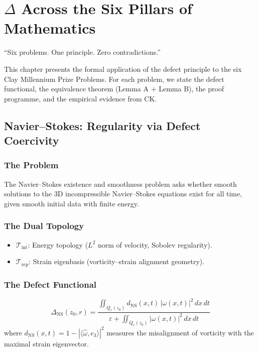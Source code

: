 \documentclass[12pt, openany]{book}
\theoremstyle{remark}
\newcommand{\Tint}{\mathcal{T}_{\mathrm{int}}}
\newcommand{\Trep}{\mathcal{T}_{\mathrm{rep}}}
\begin{document}
\chapter{$\Delta$ Across the Six Pillars of Mathematics}
\label{ch:six-pillars}

\epigraph{``Six problems. One principle. Zero contradictions.''}{}

This chapter presents the formal application of the defect principle to the six
Clay Millennium Prize Problems. For each problem, we state the defect functional,
the equivalence theorem (Lemma A $+$ Lemma B), the proof programme, and the
empirical evidence from CK.

\section{Navier--Stokes: Regularity via Defect Coercivity}
\label{sec:ns}

\subsection{The Problem}
The Navier--Stokes existence and smoothness problem asks whether smooth solutions
to the 3D incompressible Navier--Stokes equations exist for all time, given smooth
initial data with finite energy.

\subsection{The Dual Topology}
\begin{itemize}
  \item $\Tint$: Energy topology ($L^2$ norm of velocity, Sobolev regularity).
  \item $\Trep$: Strain eigenbasis (vorticity--strain alignment geometry).
\end{itemize}

\subsection{The Defect Functional}
\[
  \boxed{\Delta_{\mathrm{NS}}(z_0, r) = \frac{\displaystyle\iint_{Q_r(z_0)} d_{\mathrm{NS}}(x,t)\, |\omega(x,t)|^2\, dx\, dt}{\displaystyle\varepsilon + \iint_{Q_r(z_0)} |\omega(x,t)|^2\, dx\, dt}}
\]
where $d_{\mathrm{NS}}(x,t) = 1 - |\langle \hat{\omega}, e_3 \rangle|^2$ measures the
misalignment of vorticity with the maximal strain eigenvector.
\end{document}
